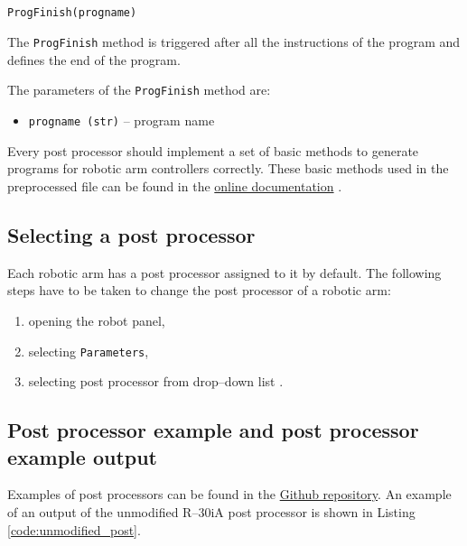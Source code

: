 \begin{verbatim}

ProgFinish(progname)

\end{verbatim}

The \texttt{ProgFinish} method is triggered after all the instructions of the program and defines the end of the program.


The parameters of the \texttt{ProgFinish} method are:

\begin{itemize}

\item \texttt{progname (str)} -- program name

\end{itemize}


 Every post processor should implement a set of basic methods to generate programs for robotic arm controllers correctly. These basic  methods used in the preprocessed file can be found in the \href{https://robodk.com/doc/en/PythonAPI/postprocessor.html#post-processor-methods}{online documentation} \cite{postmethods}.


\subsection{Selecting a post processor}

Each robotic arm has a post processor assigned to it by default. The following steps have to be taken to change the post processor of a robotic arm:


\begin{enumerate}
    \item opening the robot panel,
    \item selecting \texttt{Parameters},
    \item selecting post processor from drop--down list \cite{selectpost}.
\end{enumerate}

\subsection{Post processor example and post processor example output}

Examples of post processors can be found in the \href{https://github.com/ros-industrial/robodk_postprocessors}{Github repository}. An example of an output of the unmodified R--30iA post processor is shown in Listing \ref{code:unmodified_post}.

